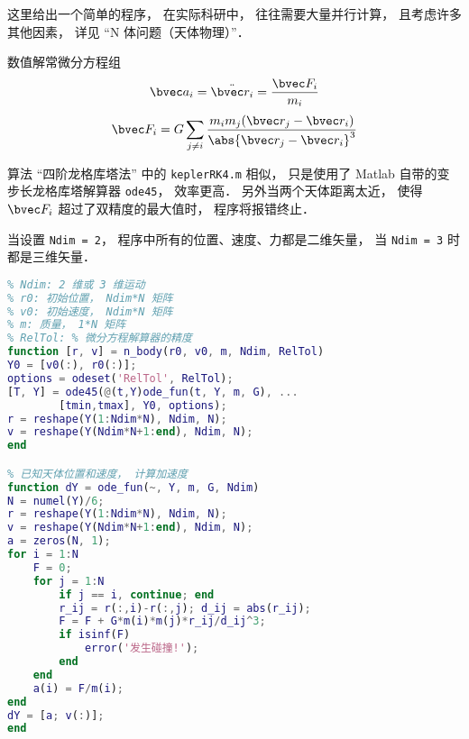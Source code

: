 
\begin{issues}
\issueDraft
\end{issues}


这里给出一个简单的程序， 在实际科研中， 往往需要大量并行计算， 且考虑许多其他因素， 详见 “N 体问题（天体物理）”．

数值解常微分方程组
\begin{equation}
\bvec a_i = \ddot{\bvec r_i} = \frac{\bvec F_i}{m_i}
\end{equation}
\begin{equation}
\bvec F_i = G\sum_{j\ne i} \frac{m_i m_j(\bvec r_j - \bvec r_i)}{\abs{\bvec r_j - \bvec r_i}^3}
\end{equation}

算法 “四阶龙格库塔法” 中的 \verb|keplerRK4.m| 相似， 只是使用了 Matlab 自带的变步长龙格库塔解算器 \verb|ode45|， 效率更高． 另外当两个天体距离太近， 使得 $\bvec F_i$ 超过了双精度的最大值时， 程序将报错终止．

当设置 \verb|Ndim = 2|， 程序中所有的位置、速度、力都是二维矢量， 当 \verb|Ndim = 3| 时都是三维矢量．


\begin{lstlisting}[language=matlab]
% N 体问题（支持二维或三维）
% Ndim: 2 维或 3 维运动
% r0: 初始位置， Ndim*N 矩阵
% v0: 初始速度， Ndim*N 矩阵
% m: 质量， 1*N 矩阵
% RelTol: % 微分方程解算器的精度
function [r, v] = n_body(r0, v0, m, Ndim, RelTol)
Y0 = [v0(:), r0(:)];
options = odeset('RelTol', RelTol);
[T, Y] = ode45(@(t,Y)ode_fun(t, Y, m, G), ...
        [tmin,tmax], Y0, options);
r = reshape(Y(1:Ndim*N), Ndim, N);
v = reshape(Y(Ndim*N+1:end), Ndim, N);
end

% 已知天体位置和速度， 计算加速度
function dY = ode_fun(~, Y, m, G, Ndim)
N = numel(Y)/6;
r = reshape(Y(1:Ndim*N), Ndim, N);
v = reshape(Y(Ndim*N+1:end), Ndim, N);
a = zeros(N, 1);
for i = 1:N
    F = 0;
    for j = 1:N
        if j == i, continue; end
        r_ij = r(:,i)-r(:,j); d_ij = abs(r_ij);
        F = F + G*m(i)*m(j)*r_ij/d_ij^3;
        if isinf(F)
            error('发生碰撞!');
        end
    end
    a(i) = F/m(i);
end
dY = [a; v(:)];
end
\end{lstlisting}

